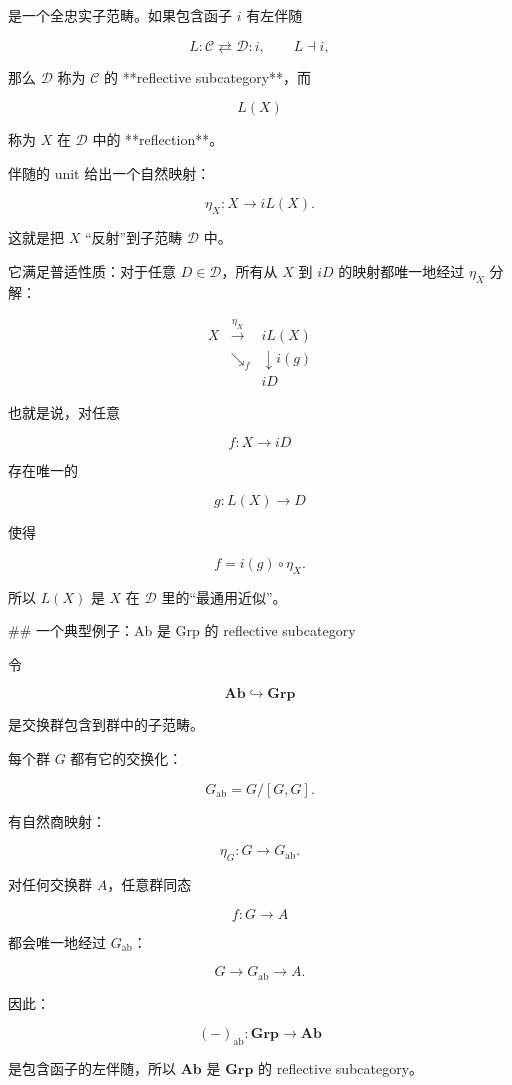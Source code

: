 \documentclass{ctexart}
\begin{document}
\begin{markdown}
是一个全忠实子范畴。如果包含函子 $i$ 有左伴随

$$
L:\mathcal C\rightleftarrows\mathcal D:i,
\qquad L\dashv i,
$$

那么 $\mathcal D$ 称为 $\mathcal C$ 的 **reflective subcategory**，而

$$
L(X)
$$

称为 $X$ 在 $\mathcal D$ 中的 **reflection**。

伴随的 unit 给出一个自然映射：

$$
\eta_X:X\to iL(X).
$$

这就是把 $X$ “反射”到子范畴 $\mathcal D$ 中。

它满足普适性质：对于任意 $D\in\mathcal D$，所有从 $X$ 到 $iD$ 的映射都唯一地经过 $\eta_X$ 分解：

$$
\begin{array}{ccc}
X & \xrightarrow{\eta_X} & iL(X)\\
& \searrow_f & \downarrow i(g)\\
&& iD
\end{array}
$$

也就是说，对任意

$$
f:X\to iD
$$

存在唯一的

$$
g:L(X)\to D
$$

使得

$$
f=i(g)\circ\eta_X.
$$

所以 $L(X)$ 是 $X$ 在 $\mathcal D$ 里的“最通用近似”。

## 一个典型例子：Ab 是 Grp 的 reflective subcategory

令

$$
\mathbf{Ab}\hookrightarrow\mathbf{Grp}
$$

是交换群包含到群中的子范畴。

每个群 $G$ 都有它的交换化：

$$
G_{\mathrm{ab}}=G/[G,G].
$$

有自然商映射：

$$
\eta_G:G\to G_{\mathrm{ab}}.
$$

对任何交换群 $A$，任意群同态

$$
f:G\to A
$$

都会唯一地经过 $G_{\mathrm{ab}}$：

$$
G\to G_{\mathrm{ab}}\to A.
$$

因此：

$$
(-)_{\mathrm{ab}}:\mathbf{Grp}\to\mathbf{Ab}
$$

是包含函子的左伴随，所以 $\mathbf{Ab}$ 是 $\mathbf{Grp}$ 的 reflective subcategory。


\end{markdown}
\end{document}
